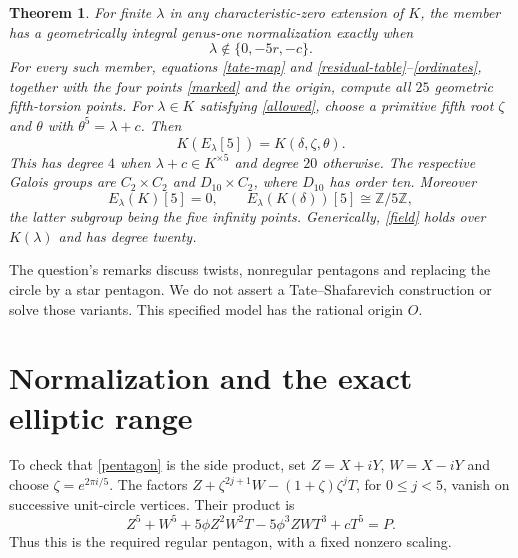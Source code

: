\documentclass[11pt]{article}
\newtheorem{theorem}{Theorem}
\begin{document}
\begin{theorem}\label{main}
For finite $\lambda$ in any characteristic-zero extension of $K$, the
member has a geometrically integral genus-one normalization exactly when
\begin{equation}\label{allowed}
\lambda\notin\{0,-5r,-c\}.
\end{equation}
For every such member, equations \eqref{tate-map} and
\eqref{residual-table}--\eqref{ordinates}, together with the four points
\eqref{marked} and the origin, compute all $25$ geometric fifth-torsion
points. For $\lambda\in K$ satisfying \eqref{allowed}, choose a primitive
fifth root $\zeta$ and $\theta$ with $\theta^5=\lambda+c$. Then
\begin{equation}\label{field}
K(E_\lambda[5])=K(\delta,\zeta,\theta).
\end{equation}
This has degree $4$ when $\lambda+c\in K^{\times5}$ and degree $20$
otherwise. The respective Galois groups are $C_2\times C_2$ and
$D_{10}\times C_2$, where $D_{10}$ has order ten. Moreover
\begin{equation}\label{rational}
E_\lambda(K)[5]=0,\qquad
E_\lambda(K(\delta))[5]\cong\mathbb Z/5\mathbb Z,
\end{equation}
the latter subgroup being the five infinity points. Generically,
\eqref{field} holds over $K(\lambda)$ and has degree twenty.
\end{theorem}

The question's remarks discuss twists, nonregular pentagons and replacing
the circle by a star pentagon. We do not assert a Tate--Shafarevich
construction or solve those variants. This specified model has the
rational origin $O$.

\section{Normalization and the exact elliptic range}
To check that \eqref{pentagon} is the side product, set $Z=X+iY$,
$W=X-iY$ and choose $\zeta=e^{2\pi i/5}$. The factors
$Z+\zeta^{2j+1}W-(1+\zeta)\zeta^jT$, for $0\le j<5$, vanish on
successive unit-circle vertices. Their product is
\[
Z^5+W^5+5\phi Z^2W^2T-5\phi^3ZWT^3+cT^5=P.
\]
Thus this is the required regular pentagon, with a fixed nonzero scaling.
\end{document}
